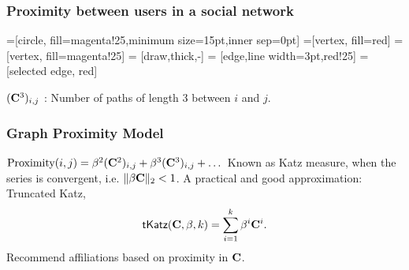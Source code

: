 \documentclass[handout]{beamer}
\begin{document}
\begin{frame}
\frametitle{Proximity between users in a social network}
=[circle, fill=magenta!25,minimum size=15pt,inner sep=0pt]
=[vertex, fill=red]
=[vertex, fill=magenta!25]
 = [draw,thick,-]
 = [edge,line width=3pt,red!25]
 = [selected edge, red]

\begin{center}
\end{center}
\pause
$(\mathbf{C}^{3})_{i,j}$ : Number of paths of length 3 between $i$ and $j$.
\end{frame}

\begin{frame}
\frametitle{Graph Proximity Model}
\begin{itemize}
\pitem $\text{Proximity}(i, j) = \beta^{2} (\mathbf{C}^{2})_{i,j} + \beta^{3}(\mathbf{C}^3)_{i,j} + \dots$
\pitem Known as Katz measure, when the series is convergent, i.e. $\|\beta \mathbf{C} \|_{2} < 1$.
\pitem A practical and good approximation: Truncated Katz,
\[ \textsf{tKatz}(\mathbf{C}, \beta, k) = \sum_{i=1}^{k} \beta^i \mathbf{C}^i. \]
\pitem Recommend affiliations based on proximity in $\mathbf{C}$.
\end{itemize}
\end{frame}
\end{document}
